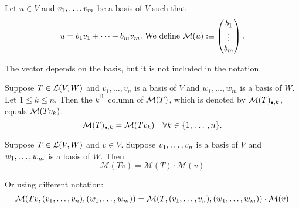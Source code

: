   \begin{mydef} 
    Let $u \in V$ and $v_1, \dots, v_m$ be a basis of $V$ such that
  \begin{equation}
    u=b_1v_1+\dots+b_mv_m. $ We define $
        \mathcal{M}(u) :\equiv
      \left (
      \begin{matrix}
        b_1 \\ \vdots \\ b_m
      \end{matrix}
      \right ).
  \end{equation}

    The vector depends on the basis, but it is not included in the notation.

  \end{mydef}

  \setcounter{thm}{74}
  \begin{thm} [$\mmatrix(T)_{\mathsmaller{\bullet}, k} = \mmatrix(T v_k)$]
    Suppose $T \in \mathcal{L}(V,W)$ and $v_1, \ldots, v_n$ is a basis of $V$ and $w_1, \ldots, w_m$ is a basis of $W$. Let $1\leq k \leq n$. Then the $k^{\text{th}}$ column of $\mathcal{M}(T)$, which is denoted by $\mmatrix(T)_{\mathsmaller{\bullet}, k}$, equals $\mathcal{M}(Tv_k)$.
    \begin{equation}
      \mmatrix(T)_{\mathsmaller{\bullet}, k}=\mmatrix(Tv_k) \quad \forall k \in \{1, \ddd, n\}.
    \end{equation}
  \end{thm}

  \begin{thm} 
    Suppose $T\in {\mathcal{L}(V,W)}$ and $v\in V$. Suppose $v_1, \dots, v_n$ is a basis of $V$ and $w_1, \dots, w_m$ is a basis of $W$. Then
    \begin{equation}
      \mathcal{M} (Tv)=\mathcal{M}(T) \cdot \mathcal{M}(v)
    \end{equation}

    Or using different notation:
    \begin{equation}
      \mathcal{M} (Tv, (v_1, \dots, v_n), (w_1, \dots, w_m))=\mathcal{M}(T, (v_1, \dots, v_n), (w_1, \dots, w_m)) \cdot \mathcal{M}(v)
    \end{equation}

  \end{thm}

